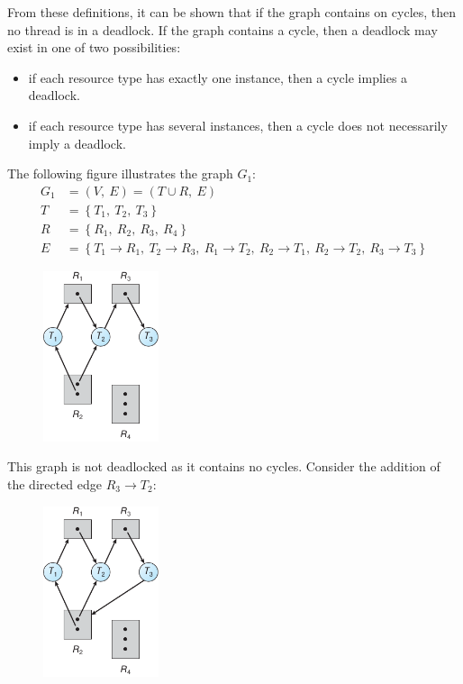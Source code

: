 \documentclass{article}
\begin{document}
From these definitions, it can be shown that if the graph contains on
cycles, then no thread is in a deadlock. If the graph contains a cycle,
then a deadlock may exist in one of two possibilities:
\begin{itemize}
    \item if each resource type has exactly one instance, then a cycle
          implies a deadlock.
    \item if each resource type has several instances, then a cycle
          does not necessarily imply a deadlock.
\end{itemize}
The following figure illustrates the graph \(G_1\):
\begin{align*}
    G_1 & = \left( V,\: E \right) = \left( T \cup R,\: E \right) \\
    T   & = \left\{ T_1,\: T_2,\: T_3 \right\}                   \\
    R   & = \left\{ R_1,\: R_2,\: R_3,\: R_4 \right\}            \\
    E   & = \left\{
    T_1 \rightarrow R_1,\: T_2 \rightarrow R_3,\:
    R_1 \rightarrow T_2,\:
    R_2 \rightarrow T_1,\: R_2 \rightarrow T_2,\:
    R_3 \rightarrow T_3
    \right\}
\end{align*}
\begin{figure}[H]
    \centering
    \includegraphics[height = 5cm]{figures/resource_allocation_graph_1.pdf}
\end{figure}
This graph is not deadlocked as it contains no cycles. Consider the
addition of the directed edge \(R_3 \rightarrow T_2\):
\begin{figure}[H]
    \centering
    \includegraphics[height = 5cm]{figures/resource_allocation_graph_2.pdf}
\end{figure}
\end{document}

